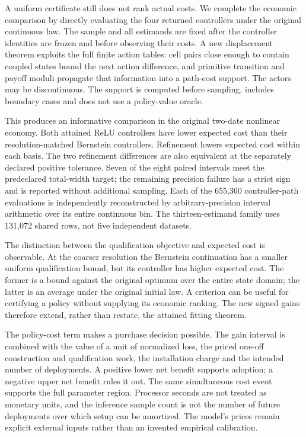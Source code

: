 \documentclass[ecta,nameyear,draft]{econsocart}
\begin{document}
A uniform certificate still does not rank actual costs. We complete the economic comparison by directly evaluating the four returned controllers under the original continuous law. The sample and all estimands are fixed after the controller identities are frozen and before observing their costs. A new displacement theorem exploits the full finite action tables: cell pairs close enough to contain coupled states bound the next action difference, and primitive transition and payoff moduli propagate that information into a path-cost support. The actors may be discontinuous. The support is computed before sampling, includes boundary cases and does not use a policy-value oracle.

This produces an informative comparison in the original two-date nonlinear economy. Both attained ReLU controllers have lower expected cost than their resolution-matched Bernstein controllers. Refinement lowers expected cost within each basis. The two refinement differences are also equivalent at the separately declared positive tolerance. Seven of the eight paired intervals meet the predeclared total-width target; the remaining precision failure has a strict sign and is reported without additional sampling. Each of the 655,360 controller-path evaluations is independently reconstructed by arbitrary-precision interval arithmetic over its entire continuous bin. The thirteen-estimand family uses 131,072 shared rows, not five independent datasets.

The distinction between the qualification objective and expected cost is observable. At the coarser resolution the Bernstein continuation has a smaller uniform qualification bound, but its controller has higher expected cost. The former is a bound against the original optimum over the entire state domain; the latter is an average under the original initial law. A criterion can be useful for certifying a policy without supplying its economic ranking. The new signed gains therefore extend, rather than restate, the attained fitting theorem.

The policy-cost term makes a purchase decision possible. The gain interval is combined with the value of a unit of normalized loss, the priced one-off construction and qualification work, the installation charge and the intended number of deployments. A positive lower net benefit supports adoption; a negative upper net benefit rules it out. The same simultaneous cost event supports the full parameter region. Processor seconds are not treated as monetary units, and the inference sample count is not the number of future deployments over which setup can be amortized. The model's prices remain explicit external inputs rather than an invented empirical calibration.
\end{document}
